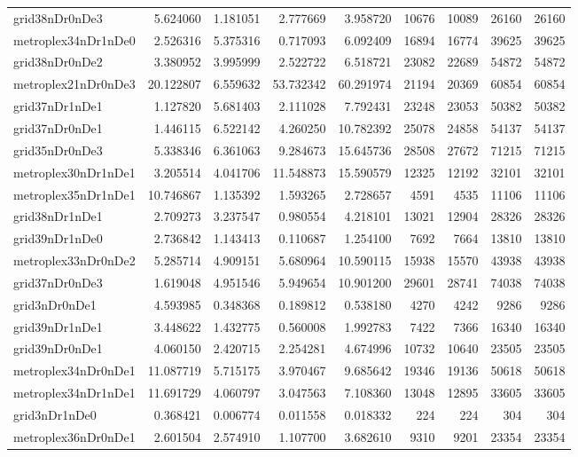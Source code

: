 \begin{longtable}{|l|r|r|r|r|r|r|r|r|}
grid38nDr0nDe3 & 5.624060 & 1.181051 & 2.777669 & 3.958720 & 10676 & 10089 & 26160 & 26160 \\
metroplex34nDr1nDe0 & 2.526316 & 5.375316 & 0.717093 & 6.092409 & 16894 & 16774 & 39625 & 39625 \\
grid38nDr0nDe2 & 3.380952 & 3.995999 & 2.522722 & 6.518721 & 23082 & 22689 & 54872 & 54872 \\
metroplex21nDr0nDe3 & 20.122807 & 6.559632 & 53.732342 & 60.291974 & 21194 & 20369 & 60854 & 60854 \\
grid37nDr1nDe1 & 1.127820 & 5.681403 & 2.111028 & 7.792431 & 23248 & 23053 & 50382 & 50382 \\
grid37nDr0nDe1 & 1.446115 & 6.522142 & 4.260250 & 10.782392 & 25078 & 24858 & 54137 & 54137 \\
grid35nDr0nDe3 & 5.338346 & 6.361063 & 9.284673 & 15.645736 & 28508 & 27672 & 71215 & 71215 \\
metroplex30nDr1nDe1 & 3.205514 & 4.041706 & 11.548873 & 15.590579 & 12325 & 12192 & 32101 & 32101 \\
metroplex35nDr1nDe1 & 10.746867 & 1.135392 & 1.593265 & 2.728657 & 4591 & 4535 & 11106 & 11106 \\
grid38nDr1nDe1 & 2.709273 & 3.237547 & 0.980554 & 4.218101 & 13021 & 12904 & 28326 & 28326 \\
grid39nDr1nDe0 & 2.736842 & 1.143413 & 0.110687 & 1.254100 & 7692 & 7664 & 13810 & 13810 \\
metroplex33nDr0nDe2 & 5.285714 & 4.909151 & 5.680964 & 10.590115 & 15938 & 15570 & 43938 & 43938 \\
grid37nDr0nDe3 & 1.619048 & 4.951546 & 5.949654 & 10.901200 & 29601 & 28741 & 74038 & 74038 \\
grid3nDr0nDe1 & 4.593985 & 0.348368 & 0.189812 & 0.538180 & 4270 & 4242 & 9286 & 9286 \\
grid39nDr1nDe1 & 3.448622 & 1.432775 & 0.560008 & 1.992783 & 7422 & 7366 & 16340 & 16340 \\
grid39nDr0nDe1 & 4.060150 & 2.420715 & 2.254281 & 4.674996 & 10732 & 10640 & 23505 & 23505 \\
metroplex34nDr0nDe1 & 11.087719 & 5.715175 & 3.970467 & 9.685642 & 19346 & 19136 & 50618 & 50618 \\
metroplex34nDr1nDe1 & 11.691729 & 4.060797 & 3.047563 & 7.108360 & 13048 & 12895 & 33605 & 33605 \\
grid3nDr1nDe0 & 0.368421 & 0.006774 & 0.011558 & 0.018332 & 224 & 224 & 304 & 304 \\
metroplex36nDr0nDe1 & 2.601504 & 2.574910 & 1.107700 & 3.682610 & 9310 & 9201 & 23354 & 23354 \\

\end{longtable}
